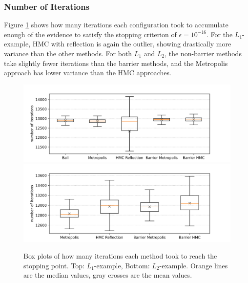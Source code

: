\documentclass[12pt, a4paper]{report}
\begin{document}
\subsubsection{Number of Iterations}
Figure \ref{fig:results_iterations} shows how many iterations each configuration took to accumulate enough of the evidence to satisfy the stopping criterion of $\epsilon = 10^{-16}$.
For the $L_1$-example, HMC with reflection is again the outlier, showing drastically more variance than the other methods.
For both $L_1$ and $L_2$, the non-barrier methods take slightly fewer iterations than the barrier methods, and the Metropolis approach has lower variance than the HMC approaches.
\begin{figure}
    \centering
    \includegraphics[scale=0.4]{figs/results/iterations_spike_20d.png}
    \includegraphics[scale=0.4]{figs/results/iterations_spike_offcenter_20d.png}
    \caption{Box plots of how many iterations each method took to reach the stopping point. Top: $L_1$-example, Bottom: $L_2$-example. Orange lines are the median values, gray crosses are the mean values.}
    \label{fig:results_iterations}
\end{figure}
\end{document}
